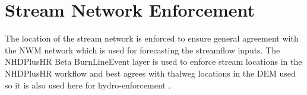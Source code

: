 \documentclass[draft]{dependencies/agujournal2019}
\begin{document}
%
%




%
%
%
%
\clearpage 
\appendix
\section{Stream Network Enforcement}
\label{sec:app_stream_network_enforcement}
The location of the stream network is enforced to ensure general agreement with the NWM network which is used for forecasting the streamflow inputs.
The NHDPlusHR Beta BurnLineEvent layer is used to enforce stream locations in the NHDPlusHR workflow and best agrees with thalweg locations in the DEM used so it is also used here for hydro-enforcement \cite{moore2019user}. 
\end{document}
